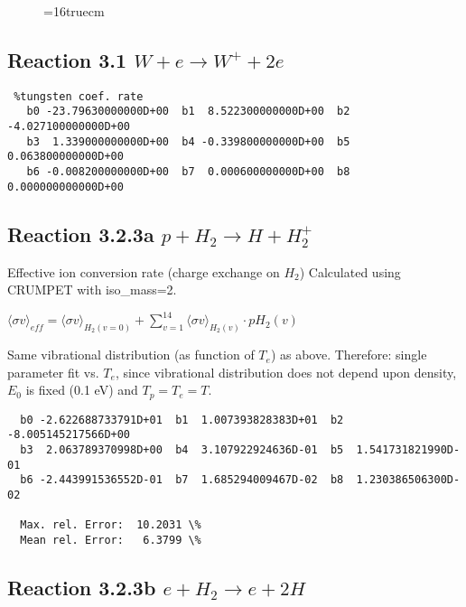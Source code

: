 \documentclass[12pt,dvipdfmx]{article}
\begin{document}
\begin{figure} \label{2.26B}
\epsfxsize=16truecm
\end{figure}

\subsection{
Reaction 3.1 $W + e \rightarrow W^+ + 2e $ }

\begin{small}\begin{verbatim} %tungsten coef. rate
   b0 -23.79630000000D+00  b1  8.522300000000D+00  b2 -4.027100000000D+00
   b3  1.339000000000D+00  b4 -0.339800000000D+00  b5  0.063800000000D+00
   b6 -0.008200000000D+00  b7  0.000600000000D+00  b8  0.000000000000D+00
\end{verbatim}\end{small}

\newpage

\subsection{
Reaction 3.2.3a   $p + H_2 \rightarrow H + H_2^+  $
}

  Effective ion conversion rate (charge exchange on $H_2$) Calculated using CRUMPET with iso_mass=2.

  $ \langle\sigma v \rangle_{eff} = \langle\sigma v \rangle_{H_2(v=0)} + \sum_{v=1}^{14}
\langle\sigma v \rangle_{H_2(v)} \cdot pH_2(v) $

  Same vibrational distribution (as function of $T_e$) as above.
  Therefore:
  single parameter fit vs. $T_e$,
  since vibrational distribution does not depend upon density, $E_0$ is fixed
  (0.1 eV) and $T_p = T_e = T$.

\begin{small}\begin{verbatim}
  b0 -2.622688733791D+01  b1  1.007393828383D+01  b2 -8.005145217566D+00
  b3  2.063789370998D+00  b4  3.107922924636D-01  b5  1.541731821990D-01
  b6 -2.443991536552D-01  b7  1.685294009467D-02  b8  1.230386506300D-02

  Max. rel. Error:  10.2031 \%
  Mean rel. Error:   6.3799 \%

\end{verbatim}\end{small}
\newpage

\subsection{
Reaction 3.2.3b   $e + H_2 \rightarrow e + 2H  $
}
\end{document}
